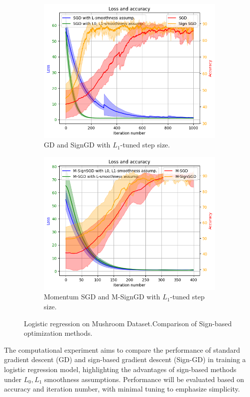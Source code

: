 \documentclass[12pt]{article}
\begin{document}
\begin{figure}[!h]
    \centering
    \begin{subfigure}[t]{0.48\textwidth}
        \centering
        \includegraphics[width=\textwidth]{basic_experiment2.png}
        \caption{GD and SignGD with $L_1$-tuned step size.}
        \label{fig:logreg}
    \end{subfigure}
    \hfill
    \begin{subfigure}[t]{0.48\textwidth}
        \centering
        \includegraphics[width=\textwidth]{msign.png}
        \caption{ Momentum SGD  and M-SignGD with $L_1$-tuned step size.}
        \label{fig:msign}
    \end{subfigure}
    \caption{Logistic regression on Mushroom Dataset.\newline Comparison of Sign-based optimization methods.}
    \label{fig:comparison}
\end{figure}
The computational experiment aims to compare the performance of standard gradient descent (GD) and sign-based gradient descent (Sign-GD) in training a logistic regression model, highlighting the advantages of sign-based methods under $L_0, L_1$ smoothness assumptions. Performance will be evaluated based on accuracy and iteration number, with minimal tuning to emphasize simplicity.
\end{document}
